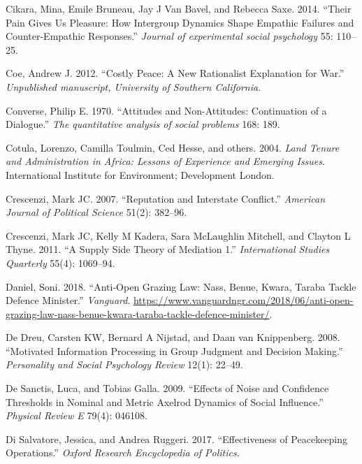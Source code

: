 \documentclass[11pt]{article}
\begin{document}
\leavevmode\hypertarget{ref-cikara2014their}{}%
Cikara, Mina, Emile Bruneau, Jay J Van Bavel, and Rebecca Saxe. 2014.
``Their Pain Gives Us Pleasure: How Intergroup Dynamics Shape Empathic
Failures and Counter-Empathic Responses.'' \emph{Journal of experimental
social psychology} 55: 110--25.

\leavevmode\hypertarget{ref-coe2012costly}{}%
Coe, Andrew J. 2012. ``Costly Peace: A New Rationalist Explanation for
War.'' \emph{Unpublished manuscript, University of Southern California}.

\leavevmode\hypertarget{ref-converse1970attitudes}{}%
Converse, Philip E. 1970. ``Attitudes and Non-Attitudes: Continuation of
a Dialogue.'' \emph{The quantitative analysis of social problems} 168:
189.

\leavevmode\hypertarget{ref-cotula2004land}{}%
Cotula, Lorenzo, Camilla Toulmin, Ced Hesse, and others. 2004.
\emph{Land Tenure and Administration in Africa: Lessons of Experience
and Emerging Issues}. International Institute for Environment;
Development London.

\leavevmode\hypertarget{ref-crescenzi2007reputation}{}%
Crescenzi, Mark JC. 2007. ``Reputation and Interstate Conflict.''
\emph{American Journal of Political Science} 51(2): 382--96.

\leavevmode\hypertarget{ref-crescenzi2011supply}{}%
Crescenzi, Mark JC, Kelly M Kadera, Sara McLaughlin Mitchell, and
Clayton L Thyne. 2011. ``A Supply Side Theory of Mediation 1.''
\emph{International Studies Quarterly} 55(4): 1069--94.

\leavevmode\hypertarget{ref-daniel2018anti}{}%
Daniel, Soni. 2018. ``Anti-Open Grazing Law: Nass, Benue, Kwara, Taraba
Tackle Defence Minister.'' \emph{Vanguard}.
\url{https://www.vanguardngr.com/2018/06/anti-open-grazing-law-nass-benue-kwara-taraba-tackle-defence-minister/}.

\leavevmode\hypertarget{ref-de2008motivated}{}%
De Dreu, Carsten KW, Bernard A Nijstad, and Daan van Knippenberg. 2008.
``Motivated Information Processing in Group Judgment and Decision
Making.'' \emph{Personality and Social Psychology Review} 12(1): 22--49.

\leavevmode\hypertarget{ref-de2009effects}{}%
De Sanctis, Luca, and Tobias Galla. 2009. ``Effects of Noise and
Confidence Thresholds in Nominal and Metric Axelrod Dynamics of Social
Influence.'' \emph{Physical Review E} 79(4): 046108.

\leavevmode\hypertarget{ref-di2017effectiveness}{}%
Di Salvatore, Jessica, and Andrea Ruggeri. 2017. ``Effectiveness of
Peacekeeping Operations.'' \emph{Oxford Research Encyclopedia of
Politics}.
\end{document}

